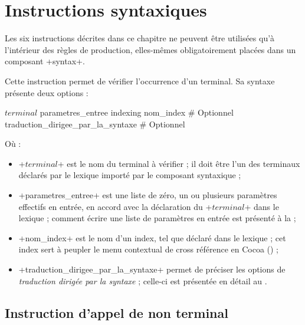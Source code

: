 
\chapter{Instructions syntaxiques}

Les six instructions décrites dans ce chapitre ne peuvent être utilisées qu'à l'intérieur des règles de production, elles-mêmes obligatoirement placées dans un composant \ggs+syntax+.




Cette instruction permet de vérifier l'occurrence d'un terminal. Sa syntaxe présente deux options :
\begin{galgas}
$terminal$ parametres_entree
indexing nom_index # Optionnel
traduction_dirigee_par_la_syntaxe # Optionnel
\end{galgas}

Où :
\begin{itemize}
  \item \ggs+$terminal$+ est le nom du terminal à vérifier ; il doit être l'un des terminaux déclarés par le lexique importé par le composant syntaxique ;
  \item \ggs+parametres_entree+ est une liste de zéro, un ou plusieurs paramètres effectifs en entrée, en accord avec la déclaration du \ggs+$terminal$+ dans le lexique ; comment écrire une liste de paramètres en entrée est présenté à la  ;
  \item \ggs+nom_index+ est le nom d'un index, tel que déclaré dans le lexique ; cet index sert à peupler le menu contextual de cross référence en Cocoa () ;
  \item \ggs+traduction_dirigee_par_la_syntaxe+ permet de préciser les options de \emph{traduction dirigée par la syntaxe} ; celle-ci est présentée en détail au . 
\end{itemize}






\section{Instruction d'appel de non terminal}





